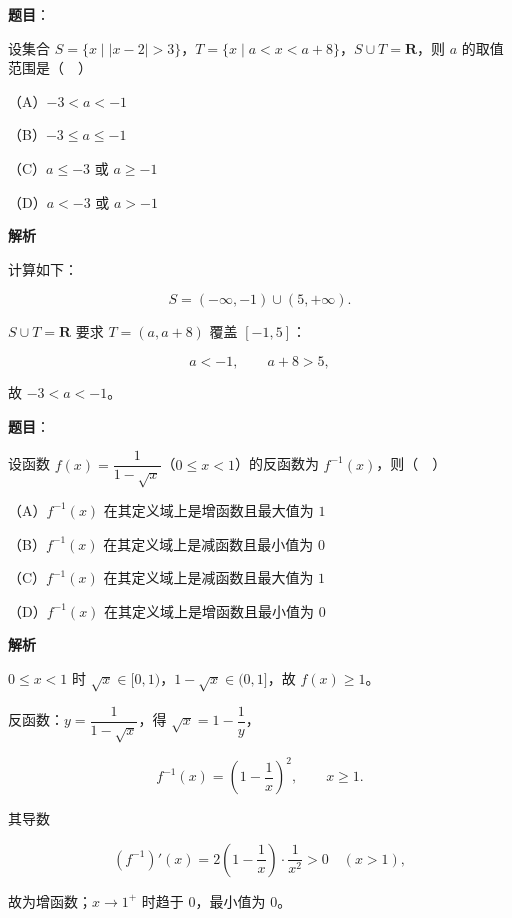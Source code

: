 \begin{answer}

\textbf{题目}：

设集合 $S=\{x\mid|x-2|>3\}$，$T=\{x\mid a<x<a+8\}$，$S\cup T=\mathbf R$，则 $a$ 的取值范围是（　）

（A）$-3<a<-1$

（B）$-3\leqslant a\leqslant-1$

（C）$a\leqslant-3$ 或 $a\geqslant-1$

（D）$a<-3$ 或 $a>-1$

\textbf{解析}

计算如下：

\nopagebreak[4]
\[S=(-\infty,-1)\cup(5,+\infty).\]

$S\cup T=\mathbf R$ 要求 $T=(a,a+8)$ 覆盖 $[-1,5]$：

\nopagebreak[4]
\[a<-1,\qquad a+8>5,\]

故 $-3<a<-1$。


\end{answer}
\begin{answer}

\textbf{题目}：

设函数 $f(x)=\dfrac1{1-\sqrt x}$（$0\leqslant x<1$）的反函数为 $f^{-1}(x)$，则（　）

（A）$f^{-1}(x)$ 在其定义域上是增函数且最大值为 $1$

（B）$f^{-1}(x)$ 在其定义域上是减函数且最小值为 $0$

（C）$f^{-1}(x)$ 在其定义域上是减函数且最大值为 $1$

（D）$f^{-1}(x)$ 在其定义域上是增函数且最小值为 $0$

\textbf{解析}

$0\leqslant x<1$ 时 $\sqrt x\in[0,1)$，$1-\sqrt x\in(0,1]$，故 $f(x)\geqslant1$。

反函数：$y=\dfrac1{1-\sqrt x}$，得 $\sqrt x=1-\dfrac1y$，

\nopagebreak[4]
\[f^{-1}(x)=\left(1-\frac1x\right)^2,\qquad x\geqslant1.\]

其导数

\nopagebreak[4]
\[\left(f^{-1}\right)'(x)=2\left(1-\frac1x\right)\cdot\frac1{x^2}>0\quad(x>1),\]

故为增函数；$x\to1^+$ 时趋于 $0$，最小值为 $0$。


\end{answer}
